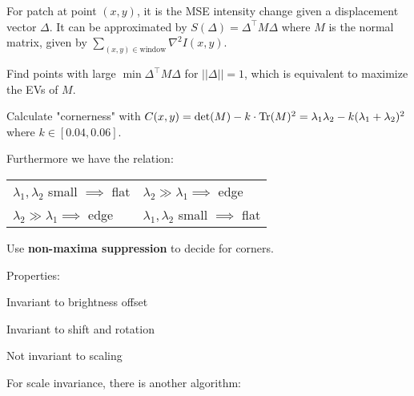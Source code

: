 \begin{definition}
For patch at point \((x, y)\), it is the MSE intensity change given a displacement vector \(\Delta\).
It can be approximated by \(S(\Delta) = \Delta^\top M \Delta\)
where \(M\) is the normal matrix, given by \(\sum_{(x, y) \in \text{window}} \nabla^2 I(x, y)\).

\end{definition}


\begin{algorithm}
  Find points with large \(\min \Delta^\top M \Delta\) for \(||\Delta|| = 1\), which is equivalent to maximize the EVs of \(M\).

  Calculate "cornerness" with \(C(x, y) = \det(M) - k \cdot \operatorname{Tr}(M)^2 = \lambda_1 \lambda_2 - k(\lambda_1 + \lambda_2)^2\) where \(k \in [0.04, 0.06]\).

  Furthermore we have the relation:

  \begin{center}
    \begin{tabularx}{\linewidth}{XX}
      \(\lambda_1, \lambda_2\) small \(\implies\) flat & \(\lambda_2 \gg \lambda_1 \implies\) edge \\
      \(\lambda_2 \gg \lambda_1 \implies\) edge & \(\lambda_1, \lambda_2\) small \(\implies\) flat
    \end{tabularx}
  \end{center}

  Use \textbf{non-maxima suppression} to decide for corners.

  Properties:
  \begin{itemize*}
    \item Invariant to brightness offset
    \item Invariant to shift and rotation
    \item Not invariant to scaling
  \end{itemize*}
\end{algorithm}

For scale invariance, there is another algorithm:

